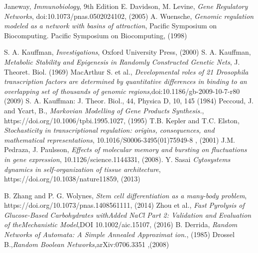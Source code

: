 \begin{thebibliography}{90}             %
\rhead[\fancyplain{}{\bfseries \leftmark}]{\fancyplain{}{\bfseries
\thepage}}

 Janeway, \emph{Immunobiology}, 9th Edition
 E. Davidson, M. Levine, \emph{Gene Regulatory Networks}, doi:10.1073/pnas.0502024102, (2005)
 A. Wuensche, \emph{Genomic regulation modeled as a network with basins of attraction}, Pacific Symposium on Biocomputing. Pacific Symposium on Biocomputing, (1998)

 S. A. Kauffman, \emph{Investigations}, Oxford University
Press, (2000)
 S. A. Kauffman, \emph{Metabolic Stability and Epigenesis in
Randomly Constructed Genetic Nets}, J. Theoret. Biol. (1969)
 MacArthur S. et al., \emph{Developmental roles of 21 Drosophila transcription factors are determined by quantitative differences in binding to an overlapping set of thousands of genomic regions},doi:10.1186/gb-2009-10-7-r80 (2009)
 S. A. Kauffman: J. Theor. Biol., 44, Physica D, 10, 145 (1984)
 Peccoud, J. and Ycart, B., \emph{Markovian Modelling of Gene Products Synthesis.}, https://doi.org/10.1006/tpbi.1995.1027, (1995)
 T.B. Kepler and T.C. Elston, \emph{Stochasticity in transcriptional regulation: origins, consequences, and mathematical representations}, 10.1016/S0006-3495(01)75949-8 , (2001)
 J.M. Pedraza, J. Paulsson, \emph{Effects of molecular memory and bursting on fluctuations in gene expression}, 10.1126/science.1144331, (2008).
 Y. Sasai \emph{Cytosystems dynamics in self-organization of tissue architecture}, https://doi.org/10.1038/nature11859, (2013)

 B. Zhang and P. G. Wolynes, \emph{Stem cell differentiation as a many-body problem}, https://doi.org/10.1073/pnas.1408561111, (2014)
 Zhou et al., \emph{Fast Pyrolysis of Glucose-Based Carbohydrates withAdded NaCl Part 2: Validation and Evaluation of theMechanistic Model},DOI 10.1002/aic.15107, (2016)
 B. Derrida, \emph{Random Networks of Automata: A Simple Annealed
Approximat ion.}, (1985)
 Drossel B.,\emph{Random Boolean Networks},arXiv:0706.3351 ,(2008)


\end{thebibliography}
